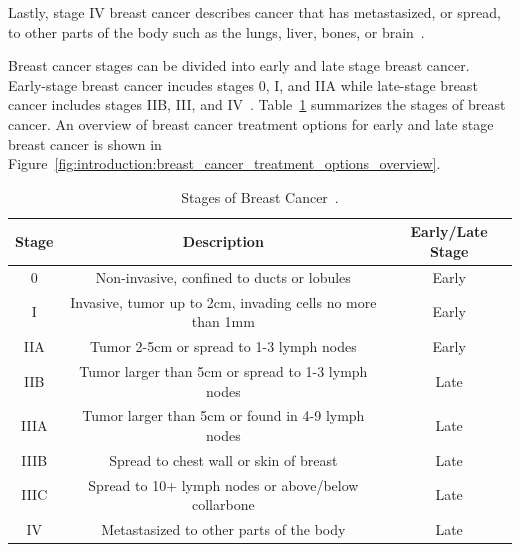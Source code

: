 Lastly, stage IV breast cancer describes cancer that has metastasized, or spread, to other parts of the body such as the lungs, liver, bones, or brain~\cite{RefWorks:RefID:151-2025breast}.

Breast cancer stages can be divided into early and late stage breast cancer. Early-stage breast cancer incudes stages 0, I, and IIA while late-stage breast cancer includes stages IIB, III, and IV~\cite{RefWorks:RefID:365-stages}. Table~\ref{tab:introduction:breastcancer:stages} summarizes the stages of breast cancer. An overview of breast cancer treatment options for early and late stage breast cancer is shown in Figure~\ref{fig:introduction:breast_cancer_treatment_options_overview}.


\begin{table}[h!]
        \centering
        \caption{Stages of Breast Cancer~\cite{RefWorks:RefID:151-2025breast, RefWorks:RefID:365-stages}.}
        \label{tab:introduction:breastcancer:stages}
        \begin{tabular}{|c|c|c|}
                \hline
                \textbf{Stage} & \textbf{Description}                                       & \textbf{Early/Late Stage} \\
                \hline
                0              & Non-invasive, confined to ducts or lobules                 & Early                     \\
                \hline
                I              & Invasive, tumor up to 2cm, invading cells no more than 1mm & Early                     \\
                \hline
                IIA            & Tumor 2-5cm or spread to 1-3 lymph nodes                   & Early                     \\
                \hline
                IIB            & Tumor larger than 5cm or spread to 1-3 lymph nodes         & Late                      \\
                \hline
                IIIA           & Tumor larger than 5cm or found in 4-9 lymph nodes          & Late                      \\
                \hline
                IIIB           & Spread to chest wall or skin of breast                     & Late                      \\
                \hline
                IIIC           & Spread to 10+ lymph nodes or above/below collarbone        & Late                      \\
                \hline
                IV             & Metastasized to other parts of the body                    & Late                      \\
                \hline
        \end{tabular}
\end{table}

